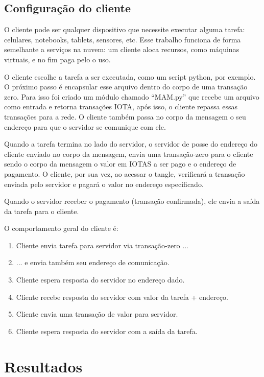 \documentclass[a4paper]{article}
\begin{document}
\subsection{Configuração do cliente}

O cliente pode ser qualquer dispositivo que necessite executar alguma tarefa: celulares, notebooks, tablets, sensores, etc.
Esse trabalho funciona de forma semelhante a serviços na nuvem: um cliente aloca recursos, como máquinas virtuais, e no fim
paga pelo o uso.

O cliente escolhe a tarefa a ser executada, como um script python, por exemplo. O próximo passo é encapsular esse arquivo dentro
do corpo de uma transação zero. Para isso foi criado um módulo chamado ``MAM.py'' que recebe um arquivo como entrada e retorna
transações IOTA, após isso, o cliente repassa essas transações para a rede. O cliente também passa no corpo da mensagem o
seu endereço para que o servidor se comunique com ele.

Quando a tarefa termina no lado do servidor, o servidor de posse do endereço do cliente enviado no corpo da mensagem, envia uma
transação-zero para o cliente sendo o corpo da mensagem o valor em IOTAS a ser pago e o endereço de pagamento. O cliente, por sua vez,
ao acessar o tangle, verificará a transação enviada pelo servidor e pagará o valor no endereço especificado.

Quando o servidor receber o pagamento (transação confirmada), ele envia a saída da tarefa para o cliente.

O comportamento geral do cliente é:

\begin{enumerate}
\item Cliente envia tarefa para servidor via transação-zero ...
\item ... e envia também seu endereço de comunicação.
\item Cliente espera resposta do servidor no endereço dado.
\item Cliente recebe resposta do servidor com valor da tarefa  + endereço.
\item Cliente envia uma transação de valor para servidor.
\item Cliente espera resposta do servidor com a saída da tarefa.
\end{enumerate}

\section{Resultados}\label{sec:Output}
\end{document}
